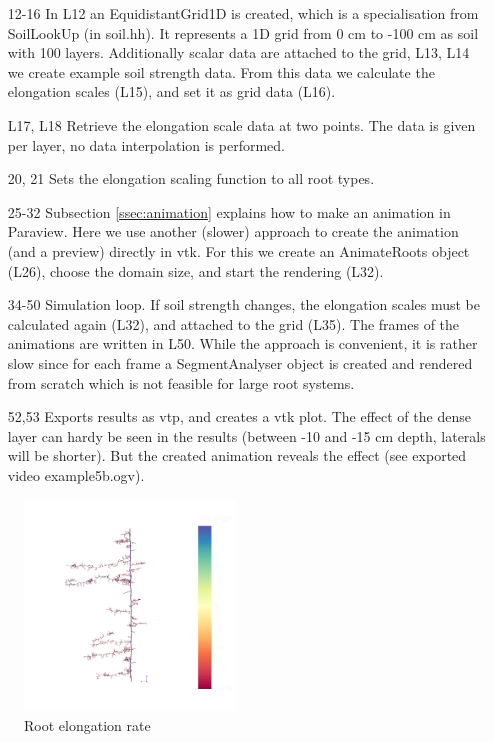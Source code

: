 \begin{itemize}

\item[12-16] In L12 an EquidistantGrid1D is created, which is a specialisation from SoilLookUp (in soil.hh). It represents a 1D grid from 0 cm to -100 cm as soil with 100 layers. Additionally scalar data are attached to the grid, L13, L14 we create example soil strength data. From this data we calculate the elongation scales (L15), and set it as grid data (L16). 

\item[L17, L18] Retrieve the elongation scale data at two points. The data is given per layer, no data interpolation is performed.

\item[20, 21] Sets the elongation scaling function to all root types.

\item[25-32] Subsection \ref{ssec:animation} explains how to make an animation in Paraview. Here we use another (slower) approach to create the animation (and a preview) directly in vtk. For this we create an AnimateRoots object (L26), choose the domain size, and start the rendering (L32). 

\item[34-50] Simulation loop. If soil strength changes, the elongation scales must be calculated again (L32), and attached to the grid (L35). The frames of the animations are written in L50. While the approach is convenient, it is rather slow since for each frame a SegmentAnalyser object is created and rendered from scratch which is not feasible for large root systems. 

\item[52,53] Exports results as vtp, and creates a vtk plot. The effect of the dense layer can hardy be seen in the results (between -10 and -15 cm depth, laterals will be shorter). But the created animation reveals the effect (see exported video example5b.ogv). 

\end{itemize}

\begin{figure}
\centering
\includegraphics[width=0.5\textwidth]{example5a.png}
\caption{Root elongation rate} \label{fig:elongation}
\end{figure}


